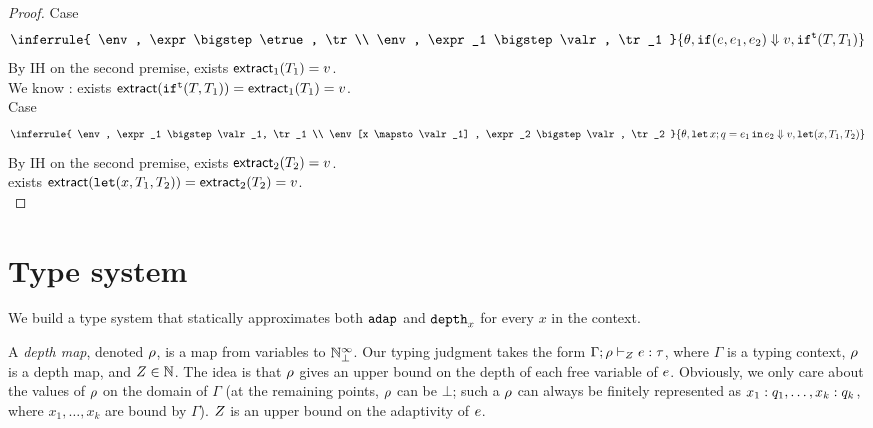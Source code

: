 \documentclass[a4paper,11pt]{article}
\theoremstyle{definition}
\begin{document}
\begin{proof}
%
\textsf{Case}
\[
 \inferrule{
    \env, \expr \bigstep \etrue, \tr \\
    \env, \expr_1 \bigstep \valr, \tr_1
  }{
    \env, \eif(\expr, \expr_1, \expr_2) \bigstep \valr, \trift(\tr, \tr_1)
  }
\]
By IH on the second premise, exists $\mathsf{extract}_1 (T_1) =
v$. \\
We know : 
 exists $\mathsf{extract} ( \mathtt{if}^{\mathtt{t}}(T, T_1) ) =
 \mathsf{extract}_1 (T_1)  = v$.\\
%
\textsf{Case}
\[
\inferrule{
  \env, \expr_1 \bigstep \valr_1, \tr_1 \\
  \env[x \mapsto \valr_1] , \expr_2 \bigstep \valr, \tr_2
}
{\env, \elet x;q = \expr_1 \ein \expr_2 \bigstep \valr, \trlet (x,
  \tr_1, \tr_2) }
\]
By IH on the second premise, exists $\mathsf{extract}_2 (T_2) =
v$. \\
 exists $\mathsf{extract} ( \mathop{\mathtt{let}} (x,
  T_1, T_2)) =
 \mathsf{extract}_2 (T_2)  = v$.\\


\end{proof}




\section{Type system}

We build a type system that statically approximates both $\mathtt{adap}$ and
$\mathtt{depth}_{x}$ for every $x$ in the context.

A \emph{depth map}, denoted $\rho$, is a map from variables to
$\mathbb{N}_{\bot}^\infty$.
%
%
Our typing judgment takes the form $\Gamma; \rho \vdash_{Z}
e: \tau$, where $\Gamma$ is a typing context, $\rho$ is a depth
map, and $Z \in \mathbb{N}$. The idea is that $\rho$ gives an upper
bound on the depth of each free variable of $e$. Obviously, we
only care about the values of $\rho$ on the domain of $\Gamma$ (at
the remaining points, $\rho$ can be $\bot$; such a $\rho$ can always
be finitely represented as $x_1: q_1, \ldots, x_k: q_k$,
where $x_1,\ldots,x_k$ are bound by $\Gamma$). $Z$ is an upper
bound on the adaptivity of $e$.
\end{document}
